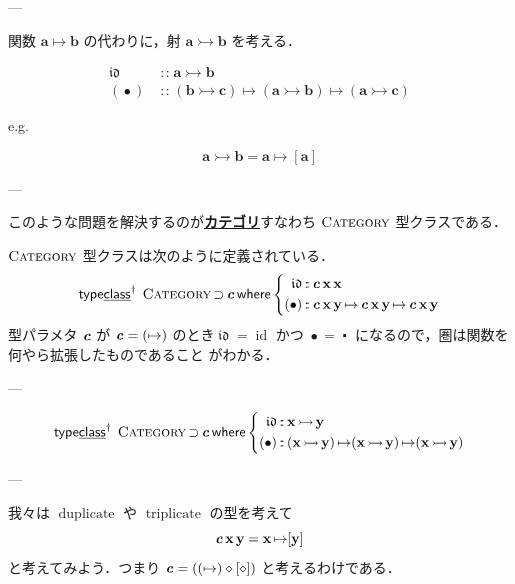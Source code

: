 \documentclass[a5paper,twoside,fleqn,draft]{jsbook}
\newcommand{\keyword}[1]{{\underline{\textbf{#1}}}}
\newcommand{\mKeyword}[1]{\mathsf{#1}}
\newcommand{\mKeywordUnderline}[1]{\text{\underline{\textsf{#1}}}}
\newcommand{\mTypeClassDeclKeyword}{\mKeyword{type}\mKeywordUnderline{class}}
\newcommand{\mWhereKeyword}{\mKeyword{where}}
\DeclareMathOperator{\mSuperSet}{\supset}
\DeclareMathOperator{\mTypeClassDeclPolymorphic}{\mTypeClassDeclKeyword^\dagger}
\DeclareMathOperator{\mWhere}{\mWhereKeyword}
\newcommand{\mAnonParam}{\diamond}
\newcommand{\mSpecialFunc}[1]{#1}
\newcommand{\mVarSpecialFunc}[1]{\mathfrak{#1}}
\DeclareMathOperator{\mDuplicate}{\mSpecialFunc{duplicate}}
\DeclareMathOperator{\mId}{\mSpecialFunc{id}}
\DeclareMathOperator{\mIdCat}{\mVarSpecialFunc{id}}
\DeclareMathOperator{\mTriplicate}{\mSpecialFunc{triplicate}}
\DeclareMathOperator{\mCatMapsTo}{\rightarrowtail}
\DeclareMathOperator{\mComp}{\centerdot}
\DeclareMathOperator{\mCompCat}{\bullet}
\DeclareMathOperator{\mFuncArrow}{\mapsto}
\DeclareMathOperator{\mIn}{{:\!:}}
\newcommand{\mType}[1]{\mathbf{#1}} %
\newcommand{\mPolymorphicTypeParameter}[1]{\textbf{\textit{#1}}}
\newcommand{\mA}{\mType{a}}
\newcommand{\mB}{\mType{b}}
\newcommand{\mC}{\mType{c}}
\newcommand{\mX}{\mType{x}}
\newcommand{\mY}{\mType{y}}
\newcommand{\mTypeClass}[1]{\textsc{#1}} %
\newcommand{\mCategoryTypeClass}{\mTypeClass{Category}}
\begin{document}
---

関数 $\mA\mFuncArrow\mB$ の代わりに，射 $\mA\mCatMapsTo\mB$ を考える．

\begin{align}
  \mIdCat
  &\mIn{}\mA\mCatMapsTo\mB\\
  (\mCompCat)
  &\mIn{}(\mB\mCatMapsTo\mC)
  \mFuncArrow(\mA\mCatMapsTo\mB)
  \mFuncArrow(\mA\mCatMapsTo\mC)
\end{align}

e.g.

\begin{equation}
  \mA\mCatMapsTo\mB
  =\mA\mFuncArrow[\mA]
\end{equation}

---


このような問題を解決するのが\keyword{カテゴリ}すなわち
$\mCategoryTypeClass$ 型クラスである．

$\mCategoryTypeClass$ 型クラスは次のように定義されている．
\begin{equation}
  \mTypeClassDeclPolymorphic\;
  \mCategoryTypeClass\mSuperSet\mPolymorphicTypeParameter{c}
  \mWhere\left\{
  \begin{aligned}
    \mIdCat&\mIn\mPolymorphicTypeParameter{c}\,\mX\,\mX\\
    (\mCompCat)
    &\mIn\mPolymorphicTypeParameter{c}\,\mX\,\mY
    \mFuncArrow\mPolymorphicTypeParameter{c}\,\mX\,\mY
    \mFuncArrow\mPolymorphicTypeParameter{c}\,\mX\,\mY
  \end{aligned}
  \right.
\end{equation}
型パラメタ $\mPolymorphicTypeParameter{c}$ が
$\mPolymorphicTypeParameter{c}=(\mFuncArrow)$ のとき$\mIdCat=\mId$ かつ
$\mCompCat=\mComp$ になるので，圏は関数を何やら拡張したものであること
がわかる．

---

\begin{equation}
  \mTypeClassDeclPolymorphic\;
  \mCategoryTypeClass\mSuperSet\mPolymorphicTypeParameter{c}
  \mWhere\left\{
  \begin{aligned}
    \mIdCat
    &\mIn\mX\mCatMapsTo\mY\\
    (\mCompCat)
    &\mIn{}(\mX\mCatMapsTo\mY)\mFuncArrow(\mX\mCatMapsTo\mY)\mFuncArrow(\mX\mCatMapsTo\mY)
  \end{aligned}
  \right.
\end{equation}

---

我々は $\mDuplicate$ や $\mTriplicate$ の型を考えて
\begin{equation}
  \mPolymorphicTypeParameter{c}\,\mX\,\mY
  =\mX\mFuncArrow[\mY]
\end{equation}
と考えてみよう．つまり
$\mPolymorphicTypeParameter{c}=((\mFuncArrow)\mAnonParam[\mAnonParam])$
と考えるわけである．
\end{document}
